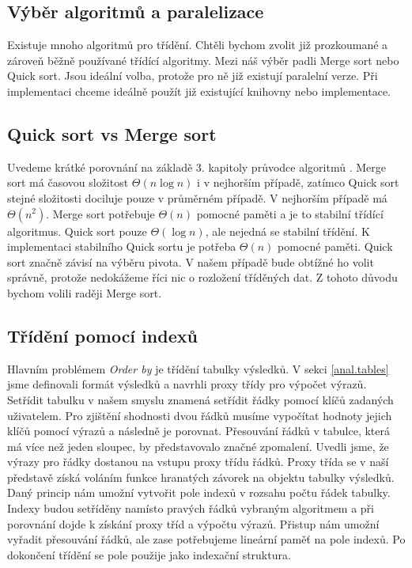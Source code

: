 \subsection{Výběr algoritmů a paralelizace}

Existuje mnoho algoritmů pro třídění.
Chtěli bychom zvolit již prozkoumané a zároveň běžně používané třídící algoritmy.
Mezi náš výběr padli Merge sort nebo Quick sort.
Jsou ideální volba, protože pro ně již existují paralelní verze.
Při implementaci chceme ideálně použít již existující knihovny nebo implementace. 

\subsection{Quick sort vs Merge sort}

Uvedeme krátké porovnání na základě 3. kapitoly průvodce algoritmů \citep{labyrint}. 
Merge sort má časovou složitost $ \Theta(n\log n) $ i v nejhorším případě, zatímco Quick sort stejné složitosti dociluje pouze v průměrném případě.
V nejhorším případě má $\Theta(n^2)$.
Merge sort potřebuje $\Theta(n)$ pomocné paměti a je to stabilní třídící algoritmus.
Quick sort pouze $\Theta(\log n)$, ale nejedná se stabilní třídění.
K implementaci stabilního Quick sortu je potřeba $\Theta(n)$ pomocné paměti.
Quick sort značně závisí na výběru pivota.
V našem případě bude obtížné ho volit správně, protože nedokážeme říci nic o rozložení tříděných dat.
Z tohoto důvodu bychom volili raději Merge sort.  

\subsection{Třídění pomocí indexů}

Hlavním problémem \textit{Order by} je třídění tabulky výsledků.
V sekci \ref{anal.tables} jsme definovali formát výsledků a navrhli proxy třídy pro výpočet výrazů.
Setřídit tabulku v našem smyslu znamená setřídit řádky pomocí klíčů zadaných uživatelem.
Pro zjištění shodnosti dvou řádků musíme vypočítat hodnoty jejich klíčů pomocí výrazů a následně je porovnat.
Přesouvání řádků v tabulce, která má více než jeden sloupec, by představovalo značné zpomalení.
Uvedli jsme, že výrazy pro řádky dostanou na vstupu proxy třídu řádků.
Proxy třída se v naší představě získá voláním funkce hranatých závorek na objektu tabulky výsledků.
Daný princip nám umožní vytvořit pole indexů v rozsahu počtu řádek tabulky.
Indexy budou setříděny namísto pravých řádků vybraným algoritmem a při porovnání dojde k získání proxy tříd a výpočtu výrazů.
Přistup nám umožní vyřadit přesouvání řádků, ale zase potřebujeme lineární paměť na pole indexů.
Po dokončení třídění se pole použije jako indexační struktura.

